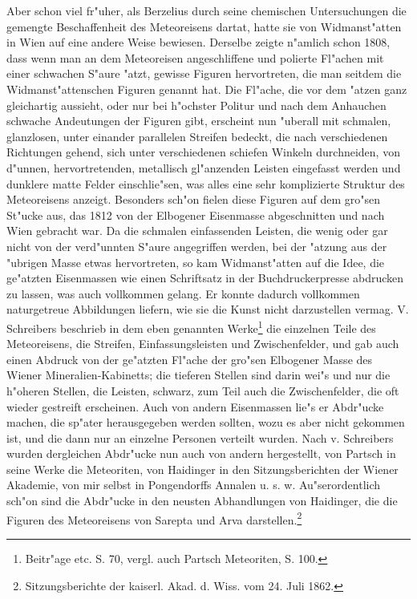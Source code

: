 \documentclass[a4paper, 11pt, oneside, german]{article}
\begin{document}
Aber schon viel fr"uher, als Berzelius durch seine chemischen Untersuchungen die gemengte Beschaffenheit des Meteoreisens dartat, hatte sie von Widmanst"atten in Wien auf eine andere Weise bewiesen. Derselbe zeigte n"amlich schon 1808, dass wenn man an dem Meteoreisen angeschliffene und polierte Fl"achen mit einer schwachen S"aure "atzt, gewisse Figuren hervortreten, die man seitdem die Widmanst"attenschen Figuren genannt hat. Die Fl"ache, die vor dem "atzen ganz gleichartig aussieht, oder nur bei h"ochster Politur und nach dem Anhauchen schwache Andeutungen der Figuren gibt, erscheint nun "uberall mit schmalen, glanzlosen, unter einander parallelen Streifen bedeckt, die nach verschiedenen Richtungen gehend, sich unter verschiedenen schiefen Winkeln durchneiden, von d"unnen, hervortretenden, metallisch gl"anzenden Leisten eingefasst werden und dunklere matte Felder einschlie"sen, was alles eine sehr komplizierte Struktur des Meteoreisens anzeigt. Besonders sch"on fielen diese Figuren auf dem gro"sen St"ucke aus, das 1812 von der Elbogener Eisenmasse abgeschnitten und nach Wien gebracht war. Da die schmalen einfassenden Leisten, die wenig oder gar nicht von der verd"unnten S"aure angegriffen werden, bei der "atzung aus der "ubrigen Masse etwas hervortreten, so kam Widmanst"atten auf die Idee, die ge"atzten Eisenmassen wie einen Schriftsatz in der Buchdruckerpresse abdrucken zu lassen, was auch vollkommen gelang. Er konnte dadurch vollkommen naturgetreue Abbildungen liefern, wie sie die Kunst nicht darzustellen vermag. V. Schreibers beschrieb in dem eben genannten Werke\footnote{Beitr"age etc. S. 70, vergl. auch Partsch Meteoriten, S. 100.} die einzelnen Teile des Meteoreisens, die Streifen, Einfassungsleisten und Zwischenfelder, und gab auch einen Abdruck von der ge"atzten Fl"ache der gro"sen Elbogener Masse des Wiener Mineralien-Kabinetts; die tieferen Stellen sind darin wei"s und nur die h"oheren Stellen, die Leisten, schwarz, zum Teil auch die Zwischenfelder, die oft wieder gestreift erscheinen. Auch von andern Eisenmassen lie"s er Abdr"ucke machen, die sp"ater herausgegeben werden sollten, wozu es aber nicht gekommen ist, und die dann nur an einzelne Personen verteilt wurden. Nach v. Schreibers wurden dergleichen Abdr"ucke nun auch von andern hergestellt, von Partsch in seine Werke die Meteoriten, von Haidinger in den Sitzungsberichten der Wiener Akademie, von mir selbst in Pongendorffs Annalen u. s. w. Au"serordentlich sch"on sind die Abdr"ucke in den neusten Abhandlungen von Haidinger, die die Figuren des Meteoreisens von Sarepta und Arva darstellen.\footnote{Sitzungsberichte der kaiserl. Akad. d. Wiss. vom 24. Juli 1862.}
\end{document}
